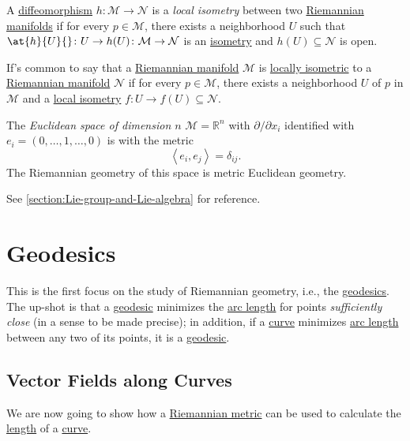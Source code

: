 \begin{definition}\label{def:local-isometry}
	A \hyperref[def:diffeomorphism]{diffeomorphism} \(h\colon \mathcal{M} \to \mathcal{N} \) is a \emph{local isometry} between two \hyperref[def:Riemannian-manifold]{Riemannian manifolds} if for every \(p\in \mathcal{M} \), there exists a neighborhood \(U\) such that \(\at{h}{U}{} \colon U \to h(U)\colon \mathcal{M} \to \mathcal{N} \) is an \hyperref[def:isometry]{isometry} and \(h(U) \subseteq \mathcal{N} \) is open.
\end{definition}

If's common to say that a \hyperref[def:Riemannian-manifold]{Riemannian manifold} \(\mathcal{M} \) is \hyperref[def:local-isometry]{locally isometric} to a \hyperref[def:Riemannian-manifold]{Riemannian manifold} \(\mathcal{N} \) if for every \(p\in \mathcal{M} \), there exists a neighborhood \(U\) of \(p\) in \(\mathcal{M} \) and a \hyperref[def:local-isometry]{local isometry} \(f\colon U \to f(U) \subseteq \mathcal{N} \).

\begin{eg}
	The \emph{Euclidean space of dimension \(n\)} \(\mathcal{M} = \mathbb{R} ^n\) with \(\partial /\partial x_i\) identified with \(e_i =(0, \dots , 1, \dots , 0)\) is with the metric
	\[
		\left\langle e_i, e_j \right\rangle = \delta _{ij}.
	\]
	The Riemannian geometry of this space is metric Euclidean geometry.
\end{eg}

\begin{eg}
	See \autoref{section:Lie-group-and-Lie-algebra} for reference.
\end{eg}

\section{Geodesics}
This is the first focus on the study of Riemannian geometry, i.e., the \hyperref[def:geodesic]{geodesics}. The up-shot is that a \hyperref[def:geodesic]{geodesic} minimizes the \hyperref[def:length]{arc length} for points \emph{sufficiently close} (in a sense to be made precise); in addition, if a \hyperref[def:curve]{curve} minimizes \hyperref[def:length]{arc length} between any two of its points, it is a \hyperref[def:geodesic]{geodesic}.

\subsection{Vector Fields along Curves}
We are now going to show how a \hyperref[def:Riemannian-metric]{Riemannian metric} can be used to calculate the \hyperref[def:length]{length} of a \hyperref[def:curve]{curve}.


